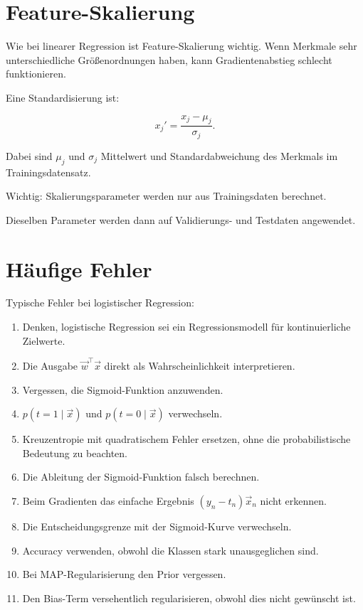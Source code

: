 \section{Feature-Skalierung}

Wie bei linearer Regression ist Feature-Skalierung wichtig.
Wenn Merkmale sehr unterschiedliche Größenordnungen haben, kann Gradientenabstieg schlecht funktionieren.

Eine Standardisierung ist:

\[
    x_j'
    =
    \frac{x_j-\mu_j}{\sigma_j}.
\]

Dabei sind \(\mu_j\) und \(\sigma_j\) Mittelwert und Standardabweichung des Merkmals im Trainingsdatensatz.

\begin{examtipbox}
Wichtig:
Skalierungsparameter werden nur aus Trainingsdaten berechnet.

Dieselben Parameter werden dann auf Validierungs- und Testdaten angewendet.
\end{examtipbox}

\section{Häufige Fehler}

\begin{examtipbox}
Typische Fehler bei logistischer Regression:

\begin{enumerate}
    \item Denken, logistische Regression sei ein Regressionsmodell für kontinuierliche Zielwerte.
    \item Die Ausgabe \(\vec{w}^{\top}\vec{x}\) direkt als Wahrscheinlichkeit interpretieren.
    \item Vergessen, die Sigmoid-Funktion anzuwenden.
    \item \(p(t=1\mid\vec{x})\) und \(p(t=0\mid\vec{x})\) verwechseln.
    \item Kreuzentropie mit quadratischem Fehler ersetzen, ohne die probabilistische Bedeutung zu beachten.
    \item Die Ableitung der Sigmoid-Funktion falsch berechnen.
    \item Beim Gradienten das einfache Ergebnis \((y_n-t_n)\vec{x}_n\) nicht erkennen.
    \item Die Entscheidungsgrenze mit der Sigmoid-Kurve verwechseln.
    \item Accuracy verwenden, obwohl die Klassen stark unausgeglichen sind.
    \item Bei MAP-Regularisierung den Prior vergessen.
    \item Den Bias-Term versehentlich regularisieren, obwohl dies nicht gewünscht ist.
\end{enumerate}
\end{examtipbox}

